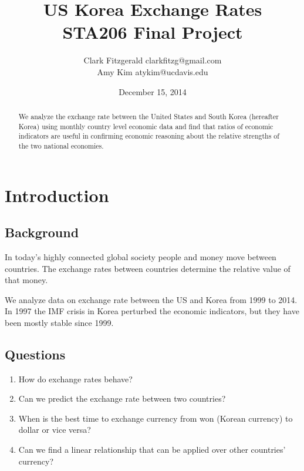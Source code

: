 \documentclass[12pt]{article}
\begin{document}
\title{US Korea Exchange Rates \\ STA206 Final Project}
\date{December 15, 2014}
\author{Clark Fitzgerald clarkfitzg@gmail.com \\ 
        Amy Kim atykim@ucdavis.edu}

\maketitle

\begin{abstract}

    We analyze the exchange rate between the United States and South Korea
    (hereafter Korea) using monthly country level economic data and find
    that ratios of economic indicators are useful in confirming economic
    reasoning about the relative strengths of the two national economies.

\end{abstract}

\section{Introduction}

\subsection{Background}

In today's highly connected global society people and money move between
countries. The exchange rates between countries determine the relative
value of that money.

We analyze data on exchange rate between the US and Korea from 1999 to
2014. In 1997 the IMF crisis in Korea perturbed the economic indicators,
but they have been mostly stable since 1999.

\subsection{Questions}

\begin{enumerate}

    \item How do exchange rates behave?

    \item Can we predict the exchange rate between two countries?  

    \item When is the best time to exchange currency from won (Korean
        currency) to dollar or vice versa?  

    \item Can we find a linear relationship
        that can be applied over other countries' currency? 

\end{enumerate}
\end{document}
